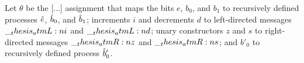Let $\theta$ be the [...] assignment that maps the bits $e$, $b_0$, and $b_1$ to recursively defined processes $\hat{e}$, $\hat{b}_0$, and $\hat{b}_1$; increments $i$ and decrements $d$ to left-directed messages $\__thesis_atmL:n {i}$ and $\__thesis_atmL:n {d}$; unary constructors $z$ and $s$ to right-directed messages $\__thesis_atmR:n {z}$ and $\__thesis_atmR:n {s}$; and $b'_0$ to recursively defined process $\hat{b}'_0$.%

